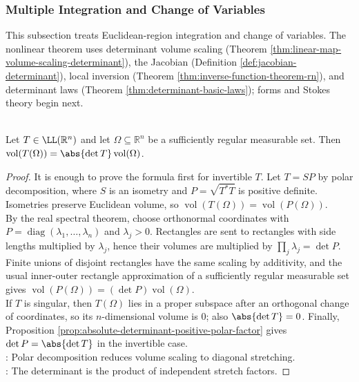 \subsubsection{Multiple Integration and Change of Variables}

This subsection treats Euclidean-region integration and change of variables. The nonlinear theorem uses determinant volume scaling (Theorem \ref{thm:linear-map-volume-scaling-determinant}), the Jacobian (Definition \ref{def:jacobian-determinant}), local inversion (Theorem \ref{thm:inverse-function-theorem-rn}), and determinant laws (Theorem \ref{thm:determinant-basic-laws}); forms and Stokes theory begin next.

\begin{theorem} \label{thm:linear-map-volume-scaling-determinant} \\
Let $T\in\LL(\mathbb{R}^n)$ and let $\Omega\subseteq\mathbb{R}^n$ be a sufficiently regular measurable set. Then $\operatorname{vol}(T(\Omega))=\abs{\det T}\operatorname{vol}(\Omega)$.
\begin{proof}
It is enough to prove the formula first for invertible $T$. Let $T=SP$ by polar decomposition, where $S$ is an isometry and $P=\sqrt{T^*T}$ is positive definite. Isometries preserve Euclidean volume, so $\operatorname{vol}(T(\Omega))=\operatorname{vol}(P(\Omega))$.\\
By the real spectral theorem, choose orthonormal coordinates with $P=\operatorname{diag}(\lambda_1,\ldots,\lambda_n)$ and $\lambda_j>0$. Rectangles are sent to rectangles with side lengths multiplied by $\lambda_j$, hence their volumes are multiplied by $\prod_j\lambda_j=\det P$. Finite unions of disjoint rectangles have the same scaling by additivity, and the usual inner-outer rectangle approximation of a sufficiently regular measurable set gives $\operatorname{vol}(P(\Omega))=(\det P)\operatorname{vol}(\Omega)$.\\
If $T$ is singular, then $T(\Omega)$ lies in a proper subspace after an orthogonal change of coordinates, so its $n$-dimensional volume is $0$; also $\abs{\det T}=0$. Finally, Proposition \ref{prop:absolute-determinant-positive-polar-factor} gives $\det P=\abs{\det T}$ in the invertible case.\\
: Polar decomposition reduces volume scaling to diagonal stretching.\\
: The determinant is the product of independent stretch factors.
\end{proof}
\end{theorem}

